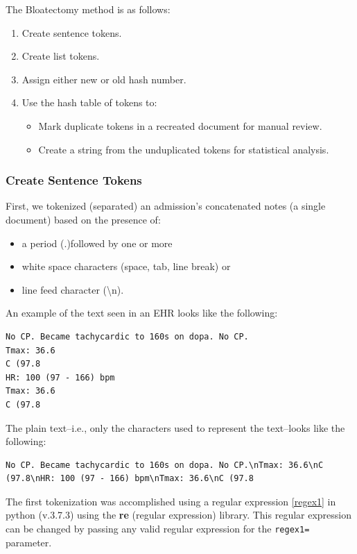 \documentclass[runningheads,a4paper]{llncs}
\begin{document}
\noindent The Bloatectomy method is as follows:
\begin{enumerate}
\item
Create sentence tokens.
\item
Create list tokens.
\item
Assign either new or old hash number.
\item
Use the hash table of tokens to:
\begin{itemize}
\item
Mark duplicate tokens in a recreated document for manual review.
\item
Create a string from the unduplicated tokens for statistical analysis.
\end{itemize}
\end{enumerate}


\subsubsection{Create Sentence Tokens}
\noindent First, we tokenized (separated) an admission's concatenated notes (a single document) based on the presence of:
\begin{itemize}
\item
a period ($.$)followed by one or more
\item
white space characters (space, tab, line break) or 
\item
line feed character (\textbackslash{}n). 
\end{itemize}

\noindent An example of the text seen in an EHR looks like the following:


\begin{lstlisting}[frame=single, style=customtext]
No CP. Became tachycardic to 160s on dopa. No CP.
Tmax: 36.6
C (97.8
HR: 100 (97 - 166) bpm
Tmax: 36.6
C (97.8
\end{lstlisting}



\noindent The plain text--i.e., only the characters used to represent the text--looks like the following:


\begin{lstlisting}[frame=single, style=customtext]
No CP. Became tachycardic to 160s on dopa. No CP.\nTmax: 36.6\nC (97.8\nHR: 100 (97 - 166) bpm\nTmax: 36.6\nC (97.8
\end{lstlisting}

\noindent The first tokenization was accomplished using a regular expression \ref{regex1} in python (v.3.7.3) using the \textbf{re} (regular expression) library. This regular expression can be changed by passing any valid regular expression for the \verb|regex1=| parameter.
\end{document}
